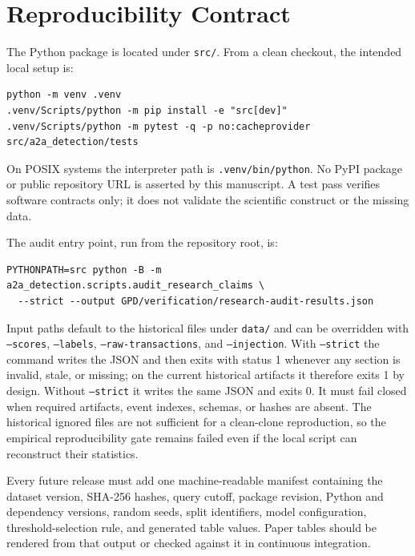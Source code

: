 \section{Reproducibility Contract}\label{app:reproducibility}

The Python package is located under \texttt{src/}.  From a clean checkout, the
intended local setup is:

\begin{verbatim}
python -m venv .venv
.venv/Scripts/python -m pip install -e "src[dev]"
.venv/Scripts/python -m pytest -q -p no:cacheprovider src/a2a_detection/tests
\end{verbatim}

On POSIX systems the interpreter path is \texttt{.venv/bin/python}.  No PyPI
package or public repository URL is asserted by this manuscript.  A test pass
verifies software contracts only; it does not validate the scientific
construct or the missing data.

The audit entry point, run from the repository root, is:

\begin{verbatim}
PYTHONPATH=src python -B -m a2a_detection.scripts.audit_research_claims \
  --strict --output GPD/verification/research-audit-results.json
\end{verbatim}

Input paths default to the historical files under \texttt{data/} and can be
overridden with \texttt{--scores}, \texttt{--labels},
\texttt{--raw-transactions}, and \texttt{--injection}.  With
\texttt{--strict} the command writes the JSON and then exits with status 1
whenever any section is invalid, stale, or missing; on the current historical
artifacts it therefore exits 1 by design.  Without \texttt{--strict} it writes
the same JSON and exits 0.  It must fail closed when required artifacts, event
indexes, schemas, or hashes are absent.  The historical ignored files are not sufficient for a clean-clone
reproduction, so the empirical reproducibility gate remains failed even if the
local script can reconstruct their statistics.

Every future release must add one machine-readable manifest containing the
dataset version, SHA-256 hashes, query cutoff, package revision, Python and
dependency versions, random seeds, split identifiers, model configuration,
threshold-selection rule, and generated table values.  Paper tables should be
rendered from that output or checked against it in continuous integration.
